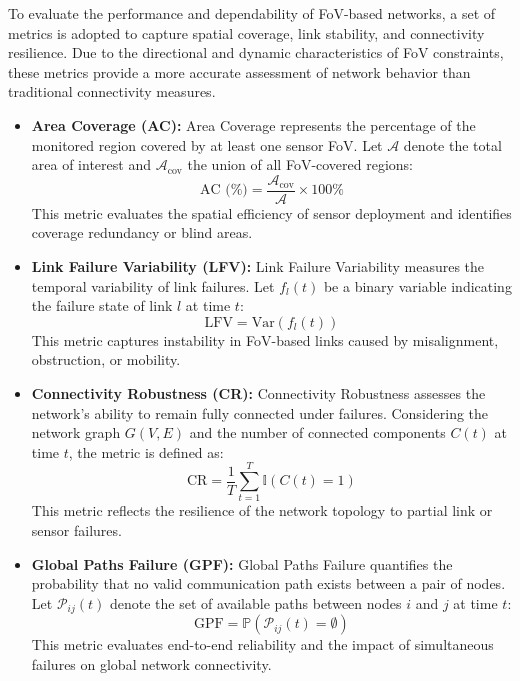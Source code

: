 To evaluate the performance and dependability of FoV-based networks, a set of metrics is adopted to capture spatial coverage, link stability, and connectivity resilience. Due to the directional and dynamic characteristics of FoV constraints, these metrics provide a more accurate assessment of network behavior than traditional connectivity measures.

\begin{itemize}

\item \textbf{Area Coverage (AC):} Area Coverage represents the percentage of the monitored region covered by at least one sensor FoV. Let $\mathcal{A}$ denote the total area of interest and $\mathcal{A}_{\text{cov}}$ the union of all FoV-covered regions:
\[
\text{AC (\%)} = \frac{\mathcal{A}_{\text{cov}}}{\mathcal{A}} \times 100\%\]
This metric evaluates the spatial efficiency of sensor deployment and identifies coverage redundancy or blind areas.

\item \textbf{Link Failure Variability (LFV):} Link Failure Variability measures the temporal variability of link failures. Let $f_l(t)$ be a binary variable indicating the failure state of link $l$ at time $t$:
\[
\text{LFV} = \mathrm{Var}\left( f_l(t) \right)
\]
This metric captures instability in FoV-based links caused by misalignment, obstruction, or mobility.

\item \textbf{Connectivity Robustness (CR):} Connectivity Robustness assesses the network’s ability to remain fully connected under failures. Considering the network graph $G(V,E)$ and the number of connected components $C(t)$ at time $t$, the metric is defined as:
\[
\text{CR} = \frac{1}{T} \sum_{t=1}^{T} \mathbb{I}\left( C(t) = 1 \right)
\]
This metric reflects the resilience of the network topology to partial link or sensor failures.

\item \textbf{Global Paths Failure (GPF): } Global Paths Failure quantifies the probability that no valid communication path exists between a pair of nodes. Let $\mathcal{P}_{ij}(t)$ denote the set of available paths between nodes $i$ and $j$ at time $t$:
\[
\text{GPF} = \mathbb{P}\left( \mathcal{P}_{ij}(t) = \emptyset \right)
\]
This metric evaluates end-to-end reliability and the impact of simultaneous failures on global network connectivity.

\end{itemize}